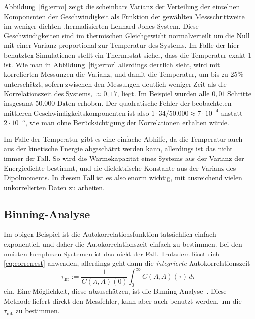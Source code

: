 Abbildung~\ref{fig:error} zeigt die scheinbare Varianz der Verteilung
der einzelnen Komponenten der Geschwindigkeit als Funktion der
gewählten Messschrittweite im weniger dichten thermalisierten
Lennard-Jones-System. Diese Geschwindigkeiten sind im thermischen
Gleichgewicht normalverteilt um die Null mit einer Varianz
proportional zur Temperatur des Systems. Im Falle der hier benutzten
Simulationen stellt ein Thermostat sicher, dass die Temperatur exakt 1
ist. Wie man in Abbildung~\ref{fig:error} allerdings deutlich sieht,
wird mit korrelierten Messungen die Varianz, und damit die Temperatur,
um bis zu 25\% unterschätzt, sofern zwischen den Messungen deutlich
weniger Zeit als die Korrelationszeit des Systems, $\approx 0,17$,
liegt. Im Beispiel wurden alle $0,01$ Schritte insgesamt 50.000 Daten
erhoben. Der quadratische Fehler der beobachteten mittleren
Geschwindigkeitskomponenten ist also $1\cdot 34/50.000 \approx 7\cdot
10^{-4}$ anstatt $2\cdot 10^{-5}$, wie man ohne Berücksichtigung der
Korrelationen erhalten würde.

Im Falle der Temperatur gibt es eine einfache Abhilfe, da die
Temperatur auch aus der kinetische Energie abgeschätzt werden kann,
allerdings ist das nicht immer der Fall. So wird die Wärmekapazität
eines Systems aus der Varianz der Energiedichte bestimmt, und die
dielektrische Konstante aus der Varianz des Dipolmoments. In diesem
Fall ist es also enorm wichtig, mit ausreichend vielen unkorrelierten
Daten zu arbeiten.

\subsection{Binning-Analyse}

Im obigen Beispiel ist die Autokorrelationsfunktion tatsächlich
einfach exponentiell und daher die Autokorrelationszeit einfach zu
bestimmen. Bei den meisten komplexen Systemen ist das nicht der Fall.
Trotzdem lässt sich \eqref{eq:correrrest} anwenden, allerdings geht
dann die \emph{integrierte} Autokorrelationszeit
\begin{equation}
  \tau_\text{int} := \frac{1}{C(A,A)(0)}\int_0^\infty C(A,A)(\tau)\,d\tau
\end{equation}
ein. Eine Möglichkeit, diese abzuschätzen, ist die
Binning-Analyse~\cite{janke02a}. Diese Methode liefert direkt den
Messfehler, kann aber auch benutzt werden, um die $\tau_\text{int}$ zu
bestimmen.

